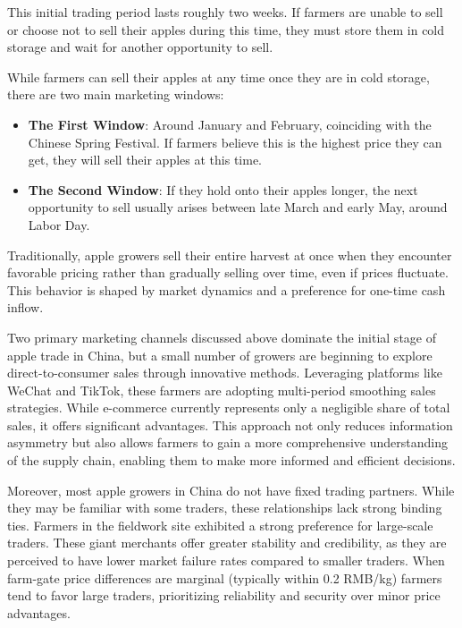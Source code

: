 This initial trading period lasts roughly two weeks. If farmers are unable to sell or choose not to sell their apples during this time, they must store them in cold storage and wait for another opportunity to sell.

While farmers can sell their apples at any time once they are in cold storage, there are two main marketing windows:

\begin{itemize}
    \item \textbf{The First Window}: Around January and February, coinciding with the Chinese Spring Festival. If farmers believe this is the highest price they can get, they will sell their apples at this time.
    \item \textbf{The Second Window}: If they hold onto their apples longer, the next opportunity to sell usually arises between late March and early May, around Labor Day.
\end{itemize}

Traditionally, apple growers sell their entire harvest at once when they encounter favorable pricing rather than gradually selling over time, even if prices fluctuate. This behavior is shaped by market dynamics and a preference for one-time cash inflow.

Two primary marketing channels discussed above dominate the initial stage of apple trade in China, but a small number of growers are beginning to explore direct-to-consumer sales through innovative methods. Leveraging platforms like WeChat and TikTok, these farmers are adopting multi-period smoothing sales strategies. While e-commerce currently represents only a negligible share of total sales, it offers significant advantages. This approach not only reduces information asymmetry but also allows farmers to gain a more comprehensive understanding of the supply chain, enabling them to make more informed and efficient decisions.


Moreover, most apple growers in China do not have fixed trading partners. While they may be familiar with some traders, these relationships lack strong binding ties. Farmers in the fieldwork site exhibited a strong preference for large-scale traders. These giant merchants offer greater stability and credibility, as they are perceived to have lower market failure rates compared to smaller traders. When farm-gate price differences are marginal (typically within 0.2 RMB/kg) farmers tend to favor large traders, prioritizing reliability and security over minor price advantages.




